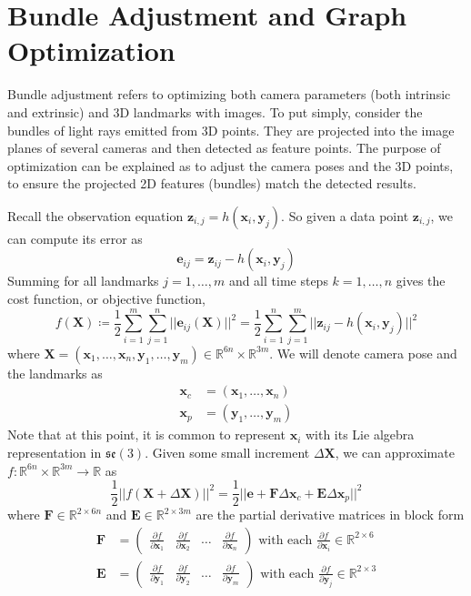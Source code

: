 \documentclass{article}
\theoremstyle{definition}
\theoremstyle{remark}
\theoremstyle{definition}
\begin{document}
\section{Bundle Adjustment and Graph Optimization}
Bundle adjustment refers to optimizing both camera parameters (both intrinsic and extrinsic) and 3D landmarks with images. To put simply, consider the bundles of light rays emitted from 3D points. They are projected into the image planes of several cameras and then detected as feature points. The purpose of optimization can be explained as to adjust the camera poses and the 3D points, to ensure the projected 2D features (bundles) match the detected results. 

Recall the observation equation $\mathbf{z}_{i, j} = h(\mathbf{x}_i, \mathbf{y}_{j})$. So given a data point $\mathbf{z}_{i, j}$, we can compute its error as 
\[\mathbf{e}_{ij} = \mathbf{z}_{ij} - h( \mathbf{x}_i, \mathbf{y}_j)\]
Summing for all landmarks $j = 1, \ldots, m$ and all time steps $k = 1, \ldots, n$ gives the cost function, or objective function, 
\[f(\mathbf{X}) \coloneqq \frac{1}{2} \sum_{i=1}^m \sum_{j=1}^n || \mathbf{e}_{ij} (\mathbf{X})||^2 = \frac{1}{2} \sum_{i=1}^n \sum_{j=1}^m ||\mathbf{z}_{ij} - h( \mathbf{x}_i, \mathbf{y}_j)||^2\]
where $\mathbf{X} = (\mathbf{x}_1, \ldots, \mathbf{x}_n, \mathbf{y}_1, \ldots, \mathbf{y}_m) \in \mathbb{R}^{6n} \times \mathbb{R}^{3m}$. We will denote camera pose and the landmarks as 
\begin{align*}
    \mathbf{x}_c & = (\mathbf{x}_1, \ldots, \mathbf{x}_n) \\ 
    \mathbf{x}_p & = (\mathbf{y}_1 , \ldots, \mathbf{y}_m)
\end{align*}
Note that at this point, it is common to represent $\mathbf{x}_i$ with its Lie algebra representation in $\mathfrak{se}(3)$. Given some small increment $\Delta \mathbf{X}$, we can approximate $f: \mathbb{R}^{6n} \times \mathbb{R}^{3m} \longrightarrow \mathbb{R}$ as 
\[\frac{1}{2} || f(\mathbf{X} + \Delta \mathbf{X})||^2 = \frac{1}{2} || \mathbf{e} + \mathbf{F} \Delta \mathbf{x}_c + \mathbf{E} \Delta \mathbf{x}_p ||^2\]
where $\mathbf{F} \in \mathbb{R}^{2 \times 6n}$ and $\mathbf{E} \in \mathbb{R}^{2 \times 3m}$ are the partial derivative matrices in block form 
\begin{align*}
    \mathbf{F} & = \begin{pmatrix} \frac{\partial f}{\partial \mathbf{x}_1} & \frac{\partial f}{\partial \mathbf{x}_2} & \ldots & \frac{\partial f}{\partial \mathbf{x}_n} \end{pmatrix} \text{ with each } \frac{\partial f}{\partial \mathbf{x}_i} \in \mathbb{R}^{2 \times 6}\\
    \mathbf{E} & = \begin{pmatrix} \frac{\partial f}{\partial \mathbf{y}_1} & \frac{\partial f}{\partial \mathbf{y}_2} & \ldots & \frac{\partial f}{\partial \mathbf{y}_m} \end{pmatrix} \text{ with each } \frac{\partial f}{\partial \mathbf{y}_j} \in \mathbb{R}^{2 \times 3} 
\end{align*}
\end{document}
